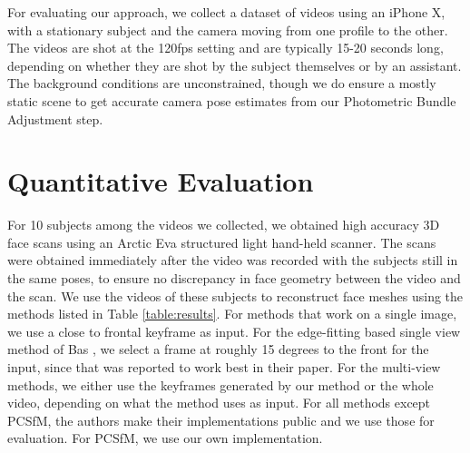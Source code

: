 

For evaluating our approach, we collect a dataset of videos using an iPhone X, with a stationary subject and the camera moving from one profile to the other. The videos are shot at the 120fps setting and are typically 15-20 seconds long, depending on whether they are shot by the subject themselves or by an assistant. The background conditions are unconstrained, though we do ensure a mostly static scene to get accurate camera pose estimates from our Photometric Bundle Adjustment step.

\section{Quantitative Evaluation} \label{sec:quant}

For 10 subjects among the videos we collected, we obtained high accuracy 3D face scans using an Arctic Eva structured light hand-held scanner. The scans were obtained immediately after the video was recorded with the subjects still in the same poses, to ensure no discrepancy in face geometry between the video and the scan. We use the videos of these subjects to reconstruct face meshes using the methods listed in Table \ref{table:results}. For methods that work on a single image, we use a close to frontal keyframe as input. For the edge-fitting based single view method of Bas \etal \cite{bas2016fitting}, we select a frame at roughly 15 degrees to the front for the input, since that was reported to work best in their paper. For the multi-view methods, we either use the keyframes generated by our method or the whole video, depending on what the method uses as input.
For all methods except PCSfM, the authors make their implementations public and we use those for evaluation. For PCSfM, we use our own implementation.

